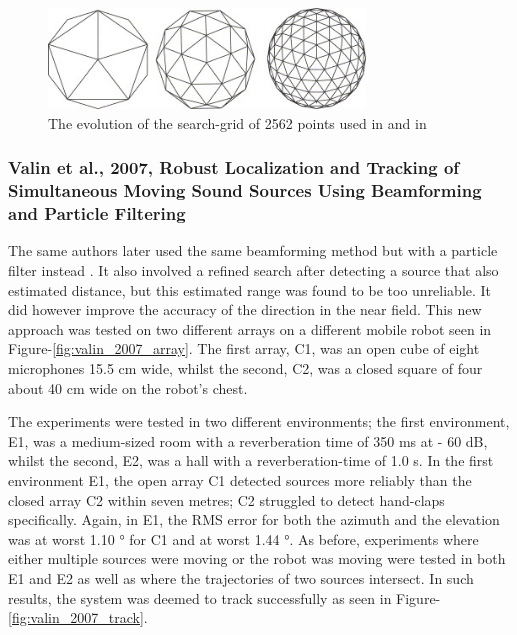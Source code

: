 \documentclass[notitlepage]{report}
\begin{document}
\begin{figure}[H]
\includegraphics[width=0.75\textwidth]{./valin_2007/grid.jpg}
\centering
\caption{The evolution of the search-grid of 2562 points used in \cite{valin_robust_2003} and in \cite{valin_robust_2007}}
\label{fig:valin_2007_grid}
\centering
\end{figure}

\subsubsection{Valin et al., 2007, Robust Localization and Tracking of Simultaneous Moving Sound Sources Using Beamforming and Particle Filtering}

The same authors later used the same beamforming method but with a particle filter instead \cite{valin_robust_2007}. It also involved a refined search after detecting a source that also estimated distance, but this estimated range was found to be too unreliable. It did however improve the accuracy of the direction in the near field. This new approach was tested on two different arrays on a different mobile robot seen in Figure-\ref{fig:valin_2007_array}. The first array, C1, was an open cube of eight microphones 15.5 \si{cm} wide, whilst the second, C2, was a closed square of four about 40 \si{cm} wide on the robot's chest. 

The experiments were tested in two different environments; the first environment, E1, was a medium-sized room with a reverberation time of 350 \si{ms} at - 60 \si{dB}, whilst the second, E2, was a hall with a reverberation-time of 1.0 \si{s}. In the first environment E1, the open array C1 detected sources more reliably than the closed array C2 within seven metres; C2 struggled to detect hand-claps specifically. Again, in E1, the RMS error for both the azimuth and the elevation was at worst 1.10 \si{\degree} for C1 and at worst 1.44 \si{\degree}. As before, experiments where either multiple sources were moving or the robot was moving were tested in both E1 and E2 as well as where the trajectories of two sources intersect. In such results, the system was deemed to track successfully as seen in Figure-\ref{fig:valin_2007_track}. 
\end{document}
